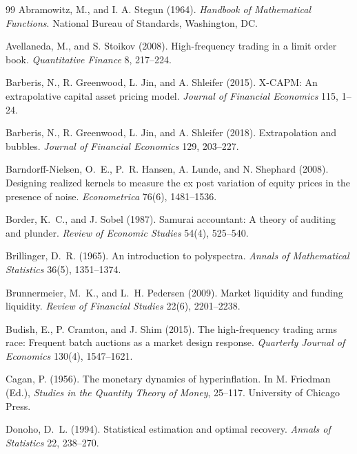 \documentclass[12pt]{article}
\theoremstyle{definition}
\theoremstyle{remark}
\begin{document}
\begin{thebibliography}{99}\setlength{\itemsep}{2pt}\small
{} Abramowitz, M., and I. A. Stegun (1964). \emph{Handbook of Mathematical Functions}. National Bureau of Standards, Washington, DC.

 Avellaneda, M., and S. Stoikov (2008). High-frequency trading in a limit order book. \emph{Quantitative Finance} 8, 217--224.

 Barberis, N., R. Greenwood, L. Jin, and A. Shleifer (2015). X-CAPM: An extrapolative capital asset pricing model. \emph{Journal of Financial Economics} 115, 1--24.

 Barberis, N., R. Greenwood, L. Jin, and A. Shleifer (2018). Extrapolation and bubbles. \emph{Journal of Financial Economics} 129, 203--227.

 Barndorff-Nielsen, O.~E., P.~R. Hansen, A. Lunde, and N. Shephard (2008). Designing realized kernels to measure the ex post variation of equity prices in the presence of noise. \emph{Econometrica} 76(6), 1481--1536.

 Border, K.~C., and J. Sobel (1987). Samurai accountant: A theory of auditing and plunder. \emph{Review of Economic Studies} 54(4), 525--540.

 Brillinger, D.~R. (1965). An introduction to polyspectra. \emph{Annals of Mathematical Statistics} 36(5), 1351--1374.

 Brunnermeier, M.~K., and L.~H. Pedersen (2009). Market liquidity and funding liquidity. \emph{Review of Financial Studies} 22(6), 2201--2238.

 Budish, E., P. Cramton, and J. Shim (2015). The high-frequency trading arms race: Frequent batch auctions as a market design response. \emph{Quarterly Journal of Economics} 130(4), 1547--1621.

 Cagan, P. (1956). The monetary dynamics of hyperinflation. In M. Friedman (Ed.), \emph{Studies in the Quantity Theory of Money}, 25--117. University of Chicago Press.

 Donoho, D.~L. (1994). Statistical estimation and optimal recovery. \emph{Annals of Statistics} 22, 238--270.


\end{thebibliography}
\end{document}
